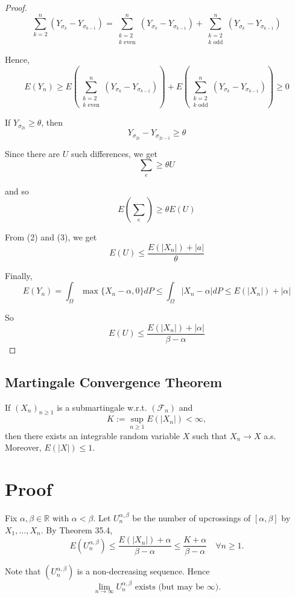 \begin{proof}
\[
\sum_{k=2}^{n} (Y_{\sigma_k} - Y_{\sigma_{k-1}}) = \sum_{\substack{k=2 \\ k \text{ even}}}^{n} (Y_{\sigma_k} - Y_{\sigma_{k-1}}) + \sum_{\substack{k=2 \\ k \text{ odd}}}^{n} (Y_{\sigma_k} - Y_{\sigma_{k-1}})
\]

Hence,
\[
E(Y_n) \geq E\left(\sum_{\substack{k=2 \\ k \text{ even}}}^{n} (Y_{\sigma_k} - Y_{\sigma_{k-1}})\right) + E\left(\sum_{\substack{k=2 \\ k \text{ odd}}}^{n} (Y_{\sigma_k} - Y_{\sigma_{k-1}})\right) \geq 0
\]

If $Y_{\sigma_{2i}} \geq \theta$, then
\[
Y_{\sigma_{2i}} - Y_{\sigma_{2i-1}} \geq \theta
\]

Since there are $U$ such differences, we get
\[
\sum_{e} \geq \theta U
\]

and so
\[
E(\sum_{e}) \geq \theta E(U) \tag{3}
\]

From (2) and (3), we get
\[
E(U) \leq \frac{E(|X_n|) + |a|}{\theta}
\]

Finally,
\[
E(Y_n) = \int_{\Omega} \max \{ X_n - \alpha, 0 \} dP \leq \int_{\Omega} |X_n - \alpha| dP \leq E(|X_n|) + |\alpha| \tag{5}
\]

So
\[
E(U) \leq \frac{E(|X_n|) + |\alpha|}{\beta - \alpha}
\]
\end{proof}

\subsection{Martingale Convergence Theorem}

If $(X_n)_{n \geq 1}$ is a submartingale w.r.t. $(\mathcal{F}_n)$ and
\[ K := \sup_{n \geq 1} E(|X_n|) < \infty, \]
then there exists an integrable random variable $X$ such that $X_n \to X$ a.s. Moreover, $E(|X|) \leq 1$.

\section*{Proof}
Fix $\alpha, \beta \in \mathbb{R}$ with $\alpha < \beta$. Let $U_n^{\alpha, \beta}$ be the number of upcrossings of $[\alpha, \beta]$ by $X_1, \ldots, X_n$. By Theorem 35.4,
\[ E(U_n^{\alpha, \beta}) \leq \frac{E(|X_n|) + \alpha}{\beta - \alpha} \leq \frac{K + \alpha}{\beta - \alpha} \quad \forall n \geq 1. \]

Note that $(U_n^{\alpha, \beta})$ is a non-decreasing sequence. Hence
\[ \lim_{n \to \infty} U_n^{\alpha, \beta} \text{ exists (but may be } \infty). \]

